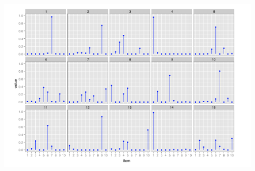 \documentclass{mediumfoils}
\begin{document}

\centerline{\includegraphics[scale=1]{pictures/dirichlet-alpha-tenth}}





%
%
%
%
%
%
\end{document}
